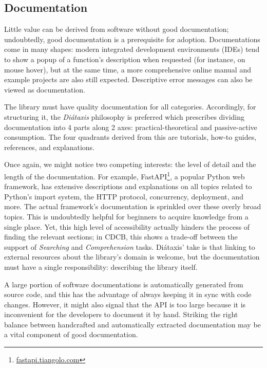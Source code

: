 \subsection{Documentation}

Little value can be derived from software without good documentation; undoubtedly, good documentation is a prerequisite for adoption. Documentations come in many shapes: modern integrated development environments (IDEs) tend to show a popup of a function's description when requested (for instance, on mouse hover), but at the same time, a more comprehensive online manual and example projects are also still expected. Descriptive error messages can also be viewed as documentation.

The library must have quality documentation for all categories. Accordingly, for structuring it, the \textit{Diátaxis} philosophy is preferred \cite{Procida_Diataxis_documentation_framework} which prescribes dividing documentation into 4 parts along 2 axes: practical-theoretical and passive-active consumption. The four quadrants derived from this are tutorials, how-to guides, references, and explanations.

Once again, we might notice two competing interests: the level of detail and the length of the documentation. For example, FastAPI\footnote{\href{https://fastapi.tiangolo.com/async/\#concurrent-burgers}{fastapi.tiangolo.com}}, a popular Python web framework, has extensive descriptions and explanations on all topics related to Python's import system, the HTTP protocol, concurrency, deployment, and more. The actual framework's documentation is sprinkled over these overly broad topics. This is undoubtedly helpful for beginners to acquire knowledge from a single place. Yet, this high level of accessibility actually hinders the process of finding the relevant sections; in CDCB, this shows a trade-off between the support of \textit{Searching} and \textit{Comprehension} tasks. Diátaxis' take is that linking to external resources about the library's domain is welcome, but the documentation must have a single responsibility: describing the library itself.

A large portion of software documentations is automatically generated from source code, and this has the advantage of always keeping it in sync with code changes. However, it might also signal that the API is too large because it is inconvenient for the developers to document it by hand. Striking the right balance between handcrafted and automatically extracted documentation may be a vital component of good documentation.

